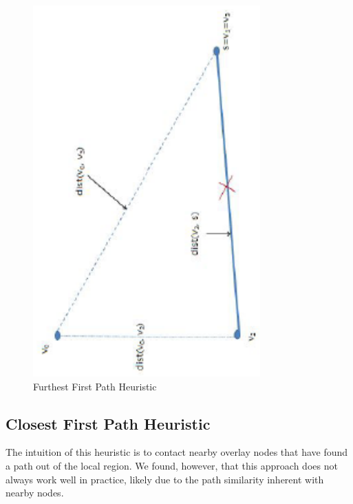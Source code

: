 \documentclass[conference]{IEEEtran}
\begin{document}
\begin{figure}[htbp]
\begin{center}
\includegraphics[scale=0.7,angle=-90]{../../images/external/location_routing/path_similarity_one_destination}
\caption{Furthest First Path Heuristic}
\end{center}
\end{figure}
%
\subsection{Closest First Path Heuristic}
The intuition of this heuristic is to contact nearby overlay nodes that have found a path out of the local region.  We found, however, that this approach does not always work well in practice, likely due to the path similarity inherent with nearby nodes.
\begin{algorithm}
\DontPrintSemicolon
{}
\SetAlgoLined
\SetAlgoLongEnd
\scriptsize
{}
\caption{}
\small
\end{algorithm}
\end{document}
